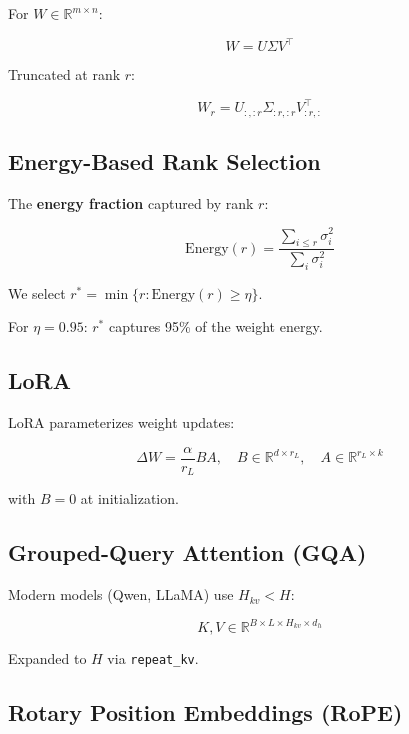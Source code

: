 For $W \in \mathbb{R}^{m \times n}$:

\begin{equation}
W = U \Sigma V^\top
\end{equation}

Truncated at rank $r$:

\begin{equation}
W_r = U_{:, :r} \Sigma_{:r, :r} V_{:r, :}^\top
\end{equation}

\subsection{Energy-Based Rank Selection}

The \textbf{energy fraction} captured by rank $r$:

\begin{equation}
\text{Energy}(r) = \frac{\sum_{i \leq r} \sigma_i^2}{\sum_i \sigma_i^2}
\end{equation}

We select $r^* = \min \{ r : \text{Energy}(r) \geq \eta \}$.

For $\eta = 0.95$: $r^*$ captures 95\% of the weight energy.

\subsection{LoRA}

LoRA parameterizes weight updates:

\begin{equation}
\Delta W = \frac{\alpha}{r_L} B A, \quad B \in \mathbb{R}^{d \times r_L}, \quad A \in \mathbb{R}^{r_L \times k}
\end{equation}

with $B = 0$ at initialization.

\subsection{Grouped-Query Attention (GQA)}

Modern models (Qwen, LLaMA) use $H_{kv} < H$:

\begin{equation}
K, V \in \mathbb{R}^{B \times L \times H_{kv} \times d_h}
\end{equation}

Expanded to $H$ via \texttt{repeat\_kv}.

\subsection{Rotary Position Embeddings (RoPE)}

